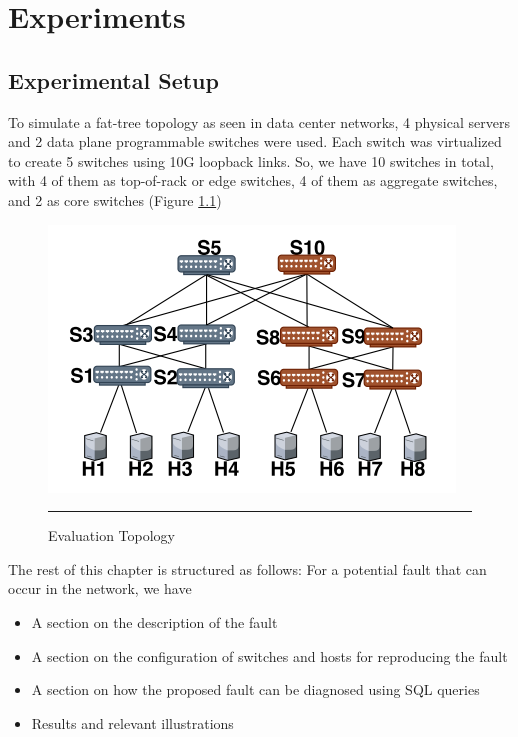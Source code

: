 
\chapter{Experiments} %

\label{Chapter3} %



\section{Experimental Setup}

To simulate a fat-tree topology as seen in data center networks, 4 physical servers and 2 data plane programmable switches were used. Each switch
was virtualized to create 5 switches using 10G loopback links. So, we have 10 switches in total, with 4 of them as top-of-rack or edge switches,
4 of them as aggregate switches, and 2 as core switches (Figure \ref{fig:Topology})

\begin{figure}[htbp]
	\centering
		\includegraphics[width=0.65\columnwidth]{Figures/Topology.png}
		\rule{35em}{0.5pt}
	\caption[Evaluation Topology]{Evaluation Topology}
	\label{fig:Topology}
\end{figure}
\clearpage
The rest of this chapter is structured as follows: For a potential fault that can occur in the network, we have
\begin{itemize}
    \item A section on the description of the fault
    \item A section on the configuration of switches and hosts for reproducing the fault
    \item A section on how the proposed fault can be diagnosed using SQL queries
    \item Results and relevant illustrations
\end{itemize}

